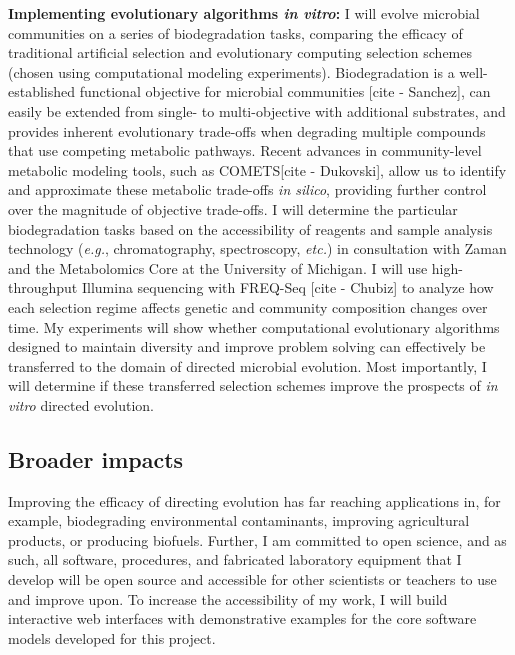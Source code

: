 \noindent
\textbf{Implementing evolutionary algorithms \textit{in vitro}:}
I will evolve microbial communities on a series of biodegradation tasks, comparing the efficacy of traditional artificial selection and evolutionary computing selection schemes (chosen using computational modeling experiments).
Biodegradation is a well-established functional objective for microbial communities [cite - Sanchez], 
can easily be extended from single- to multi-objective with additional substrates, and
provides inherent evolutionary trade-offs when degrading multiple compounds that use competing metabolic pathways.
Recent advances in community-level metabolic modeling tools, such as COMETS[cite - Dukovski], allow us to identify and approximate these metabolic trade-offs \textit{in silico}, providing further control over the magnitude of objective trade-offs. 
I will determine the particular biodegradation tasks based on the accessibility of reagents and sample analysis technology (\textit{e.g.}, chromatography, spectroscopy, \textit{etc.}) in consultation with Zaman and the Metabolomics Core at the University of Michigan.
I will use high-throughput Illumina sequencing with FREQ-Seq [cite - Chubiz] to analyze how each selection regime affects genetic and community composition changes over time.
My experiments will show whether computational evolutionary algorithms designed to maintain diversity and improve problem solving can effectively be transferred to the domain of directed microbial evolution.
Most importantly, I will determine if these transferred selection schemes improve the prospects of \textit{in vitro} directed evolution.

\vspace{-1em}
\subsection*{Broader impacts}
\vspace{-0.5em}

Improving the efficacy of directing evolution has far reaching applications in, for example, biodegrading environmental contaminants, improving agricultural products, or producing biofuels.
Further, I am committed to open science, and as such, all software, procedures, and fabricated laboratory equipment that I develop will be open source and accessible for other scientists or teachers to use and improve upon.
To increase the accessibility of my work, I will build interactive web interfaces with demonstrative examples for the core software models developed for this project.

